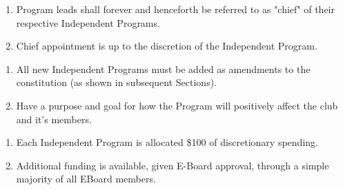 


\begin{enumerate}
  \item Program leads shall forever and henceforth be referred to as "chief" of
    their respective Independent Programs.
  \item Chief appointment is up to the discretion of the Independent Program.
\end{enumerate}


\begin{enumerate}
  \item All new Independent Programs must be added as amendments to the
    constitution (as shown in subsequent Sections).
  \item Have a purpose and goal for how the Program will positively affect the
    club and it’s members.
\end{enumerate}


\begin{enumerate}
  \item Each Independent Program is allocated \$100 of discretionary spending.
  \item Additional funding is available, given E-Board approval, through a 
    simple majority of all EBoard members.
\end{enumerate}




